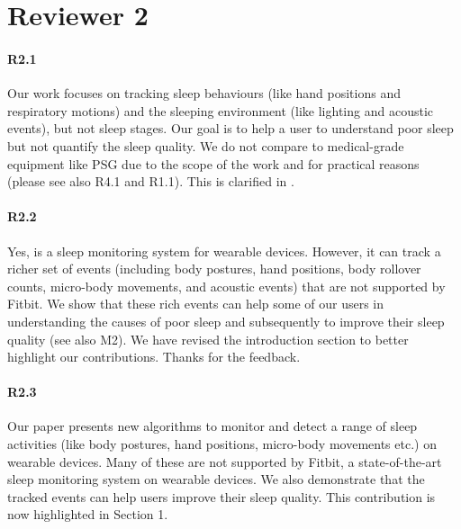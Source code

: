 \section*{Reviewer 2}
\paragraph{R2.1} Our work focuses on tracking sleep behaviours (like hand positions and respiratory motions) and the sleeping environment
(like lighting and acoustic events), but not sleep stages. Our goal is to help a user to understand poor sleep but not quantify the sleep
quality. We do not compare to medical-grade equipment like PSG due to the scope of the work and for practical reasons (please see also R4.1
and R1.1). This is clarified in .

\paragraph{R2.2} Yes, \systemname is a sleep monitoring system for wearable devices. However, it can track a richer set of events
(including body postures, hand positions, body rollover counts, micro-body movements, and acoustic events) that are not supported by
Fitbit. We show that these rich events can help some of our users in understanding the causes of poor sleep and subsequently to improve
their sleep quality (see also M2). We have revised the introduction section to better highlight our contributions. Thanks for the feedback.

\paragraph{R2.3} Our paper presents new algorithms to monitor and detect a range of sleep activities (like body postures, hand positions,
micro-body movements etc.) on wearable devices. Many of these are not supported by Fitbit, a state-of-the-art sleep monitoring system on
wearable devices. We also demonstrate that the tracked events can help users improve their sleep quality. This contribution is now
highlighted in Section 1. 
